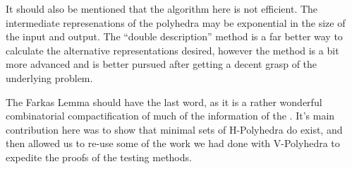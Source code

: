 It should also be mentioned that the algorithm here is not efficient.  The intermediate represenations of the polyhedra may be exponential in the size of the input and output.  The ``double description'' method is a far better way to calculate the alternative representations desired, however the method is a bit more advanced and is better pursued after getting a decent grasp of the underlying problem.

The Farkas Lemma should have the last word, as it is a rather wonderful combinatorial compactification of much of the information of the \MWT.  It's main contribution here was to show that minimal sets of H-Polyhedra do exist, and then allowed us to re-use some of the work we had done with V-Polyhedra to expedite the proofs of the testing methods.
